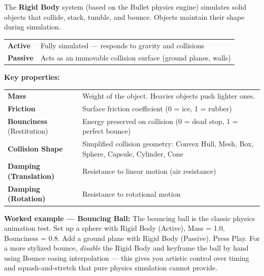 The \textbf{Rigid Body} system (based on the Bullet physics engine) simulates solid objects that collide, stack, tumble, and bounce. Objects maintain their shape during simulation.

\begin{center}
\begin{tabularx}{\textwidth}{L{2.5cm}X}
\toprule
{}
 &  \\
\midrule
\textbf{Active} & Fully simulated --- responds to gravity and collisions \\
\textbf{Passive} & Acts as an immovable collision surface (ground planes, walls) \\
\bottomrule
\end{tabularx}
\end{center}

\textbf{Key properties:}

\begin{center}
\begin{tabularx}{\textwidth}{L{3.5cm}X}
\toprule
{}
 &  \\
\midrule
\textbf{Mass} & Weight of the object. Heavier objects push lighter ones. \\
\textbf{Friction} & Surface friction coefficient (0 = ice, 1 = rubber) \\
\textbf{Bounciness} (Restitution) & Energy preserved on collision (0 = dead stop, 1 = perfect bounce) \\
\textbf{Collision Shape} & Simplified collision geometry: Convex Hull, Mesh, Box, Sphere, Capsule, Cylinder, Cone \\
\textbf{Damping (Translation)} & Resistance to linear motion (air resistance) \\
\textbf{Damping (Rotation)} & Resistance to rotational motion \\
\bottomrule
\end{tabularx}
\end{center}

\begin{tipbox}
\textbf{Worked example --- Bouncing Ball:} The bouncing ball is the classic physics animation test. Set up a sphere with Rigid Body (Active), Mass = 1.0, Bounciness = 0.8. Add a ground plane with Rigid Body (Passive). Press Play. For a more stylized bounce, \textit{disable} the Rigid Body and keyframe the ball by hand using Bounce easing interpolation --- this gives you artistic control over timing and squash-and-stretch that pure physics simulation cannot provide.
\end{tipbox}


